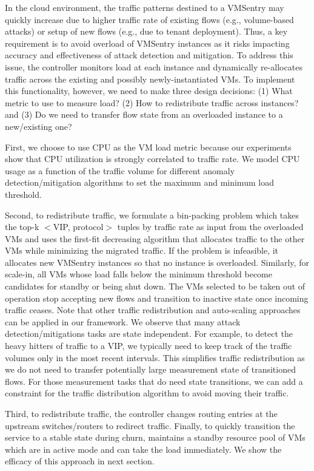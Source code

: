 In the cloud environment, the traffic patterns destined to a VMSentry may quickly increase due to higher traffic rate of 
existing flows (e.g., volume-based attacks) or setup of new flows (e.g., due to tenant deployment). Thus, a 
key requirement is to avoid overload of VMSentry instances as it risks impacting accuracy and effectiveness of attack detection and mitigation. 
To address this issue, the controller monitors load at each instance
and dynamically re-allocates traffic across the existing and possibly newly-instantiated VMs. 
To implement this functionality, however,  
we need to make three design decisions: 
(1) What metric to use to measure load? 
(2) How to redistribute traffic across instances? and 
(3) Do we need to transfer flow state from an overloaded instance to a new/existing one? 

First, we choose to use CPU as the VM load metric because our experiments show that CPU utilization is strongly correlated to traffic rate. 
We model CPU usage as a function of the traffic volume for different anomaly detection/mitigation algorithms to set the maximum and minimum load threshold. 

Second, to redistribute traffic, we formulate a bin-packing problem which takes the top-k $<$VIP, protocol$>$ tuples by traffic rate as input from the overloaded
VMs and uses the first-fit decreasing algorithm that allocates traffic to the 
other VMs while minimizing the migrated traffic. If the problem is infeasible,
it allocates new VMSentry instances so that no instance is overloaded. Similarly, for scale-in, all VMs whose load falls below the minimum threshold become 
candidates for standby or being shut down. The VMs selected to be taken out of operation stop accepting new flows and transition to inactive state once incoming traffic ceases. Note that other traffic redistribution and auto-scaling approaches can be applied in our framework.   
We observe that many attack detection/mitigations tasks are state independent. For example, to detect the heavy hitters of traffic to a VIP, we typically need to keep track of the traffic volumes only in the 
most recent intervals. This simplifies traffic redistribution as we do not need to transfer potentially large measurement state of transitioned flows.
For those measurement tasks that do need state transitions, we can 
add a constraint for the traffic distribution algorithm 
to avoid moving their traffic. 

Third, to redistribute traffic, the controller changes routing entries at the upstream switches/routers to redirect traffic. 
Finally, to quickly transition the service to a stable state during churn, \nimbus maintains a standby resource pool of VMs which
are in active mode and can take the load immediately.
We show the efficacy of this approach in next section.



